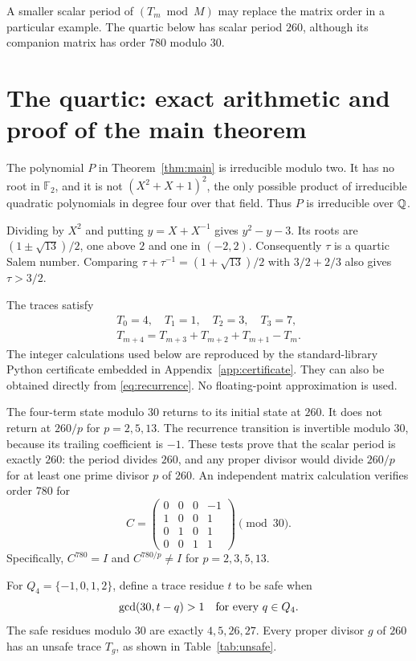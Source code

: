 \documentclass[11pt,a4paper]{article}
\theoremstyle{definition}\newtheorem{definition}[theorem]{Definition}
\theoremstyle{remark}\newtheorem{remark}[theorem]{Remark}
\begin{document}
A smaller scalar period of $(T_m\bmod M)$ may replace the matrix order in a particular example. The quartic below has scalar period $260$, although its companion matrix has order $780$ modulo $30$.

\section{The quartic: exact arithmetic and proof of the main theorem}
The polynomial $P$ in Theorem~\ref{thm:main} is irreducible modulo two. It has no root in $\mathbb F_2$, and it is not $(X^2+X+1)^2$, the only possible product of irreducible quadratic polynomials in degree four over that field. Thus $P$ is irreducible over $\mathbb Q$.

Dividing by $X^2$ and putting $y=X+X^{-1}$ gives $y^2-y-3$. Its roots are $(1\pm\sqrt{13})/2$, one above $2$ and one in $(-2,2)$. Consequently $\tau$ is a quartic Salem number. Comparing $\tau+\tau^{-1}=(1+\sqrt{13})/2$ with $3/2+2/3$ also gives $\tau>3/2$.

The traces satisfy
\begin{equation}\label{eq:recurrence}
 \begin{gathered}
 T_0=4,\quad T_1=1,\quad T_2=3,\quad T_3=7,\\
 T_{m+4}=T_{m+3}+T_{m+2}+T_{m+1}-T_m.
 \end{gathered}
\end{equation}
The integer calculations used below are reproduced by the standard-library Python certificate embedded in Appendix~\ref{app:certificate}. They can also be obtained directly from \eqref{eq:recurrence}. No floating-point approximation is used.

The four-term state modulo $30$ returns to its initial state at $260$. It does not return at $260/p$ for $p=2,5,13$. The recurrence transition is invertible modulo $30$, because its trailing coefficient is $-1$. These tests prove that the scalar period is exactly $260$: the period divides $260$, and any proper divisor would divide $260/p$ for at least one prime divisor $p$ of $260$. An independent matrix calculation verifies order $780$ for
\[
 C=\begin{pmatrix}
 0&0&0&-1\\1&0&0&1\\0&1&0&1\\0&0&1&1
 \end{pmatrix}\pmod{30}.
\]
Specifically, $C^{780}=I$ and $C^{780/p}\ne I$ for $p=2,3,5,13$.

For $Q_4=\{-1,0,1,2\}$, define a trace residue $t$ to be safe when
\[
 \gcd(30,t-q)>1\quad\hbox{for every }q\in Q_4.
\]
The safe residues modulo $30$ are exactly $4,5,26,27$. Every proper divisor $g$ of $260$ has an unsafe trace $T_g$, as shown in Table~\ref{tab:unsafe}.
\end{document}
